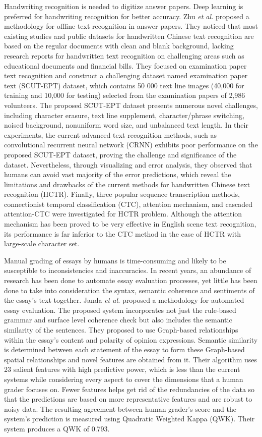 Handwriting recognition is needed to digitize answer papers. Deep learning is preferred
for handwriting recognition for better accuracy. Zhu \emph{et al.} \cite{8565866} proposed a methodology for
offline text recognition in answer papers. They noticed that most existing studies and public
datasets for handwritten Chinese text recognition are based on the regular documents with clean
and blank background, lacking research reports for handwritten text recognition on challenging
areas such as educational documents and financial bills. They focused on examination paper
text recognition and construct a challenging dataset named examination paper text (SCUT-EPT)
dataset, which contains 50 000 text line images (40,000 for training and 10,000 for testing)
selected from the examination papers of 2,986 volunteers. The proposed SCUT-EPT dataset
presents numerous novel challenges, including character erasure, text line supplement,
character/phrase switching, noised background, nonuniform word size, and unbalanced text
length. In their experiments, the current advanced text recognition methods, such as
convolutional recurrent neural network (CRNN) exhibits poor performance on the proposed
SCUT-EPT dataset, proving the challenge and significance of the dataset. Nevertheless,
through visualizing and error analysis, they observed that humans can avoid vast majority of
the error predictions, which reveal the limitations and drawbacks of the current methods for
handwritten Chinese text recognition (HCTR). Finally, three popular sequence transcription
methods, connectionist temporal classification (CTC), attention mechanism, and cascaded 
attention-CTC were investigated for HCTR problem. Although the attention mechanism has
been proved to be very effective in English scene text recognition, its performance is far inferior
to the CTC method in the case of HCTR with large-scale character set.


Manual grading of essays by humans is time-consuming and likely to be susceptible to
inconsistencies and inaccuracies. In recent years, an abundance of research has been done to
automate essay evaluation processes, yet little has been done to take into consideration the
syntax, semantic coherence and sentiments of the essay's text together. Janda \emph{et al.} \cite{8788526} proposed
a methodology for automated essay evaluation. The proposed system incorporates not just the
rule-based grammar and surface level coherence check but also includes the semantic similarity
of the sentences. They proposed to use Graph-based relationships within the essay's content and
polarity of opinion expressions. Semantic similarity is determined between each statement of
the essay to form these Graph-based spatial relationships and novel features are obtained from
it. Their algorithm uses 23 salient features with high predictive power, which is less than the
current systems while considering every aspect to cover the dimensions that a human grader
focuses on. Fewer features helps get rid of the redundancies of the data so that the predictions
are based on more representative features and are robust to noisy data. The resulting agreement
between human grader's score and the system's prediction is measured using Quadratic
Weighted Kappa (QWK). Their system produces a QWK of 0.793.
